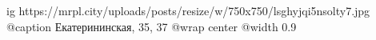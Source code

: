  
 
 
 
 

\ifcmt
  ig https://mrpl.city/uploads/posts/resize/w/750x750/lsghyjqi5nsolty7.jpg
	@caption Екатерининская, 35, 37
  @wrap center
  @width 0.9
\fi
